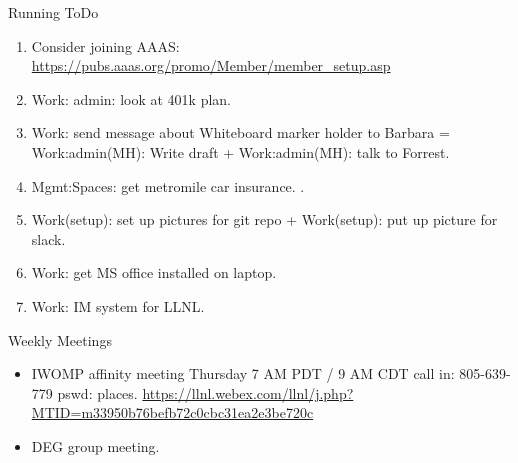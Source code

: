 \begin{columns}
\begin{column}{0.5\linewidth}
\begin{block}{Running ToDo}
\begin{enumerate}
        \item \tiny Consider joining AAAS: \url{https://pubs.aaas.org/promo/Member/member_setup.asp}

        \item \tiny Work: admin: look at 401k plan. 
        \item \tiny Work: send message about Whiteboard marker holder to
          Barbara = Work:admin(MH): Write draft +
          Work:admin(MH): talk to Forrest. 
        \item \tiny Mgmt:Spaces: get metromile car insurance.   . 
        \item \tiny Work(setup): set up pictures for git repo +
          Work(setup): put up picture for slack. 

        \item \tiny Work: get MS office installed on laptop. 
        \item \tiny Work: IM system for LLNL. 

        \end{enumerate}
      \end{block}
 

      \begin{block}{Weekly Meetings}
        \begin{itemize}
          \tiny \item \tiny IWOMP affinity meeting Thursday 7 AM PDT / 9 AM
          CDT call in: 805-639-779 pswd: places. \url{https://llnl.webex.com/llnl/j.php?MTID=m33950b76befb72c0cbc31ea2e3be720c}
        \item \tiny DEG group meeting.  
        \end{itemize}
      \end{block} 
     


\end{column}
\end{columns}
